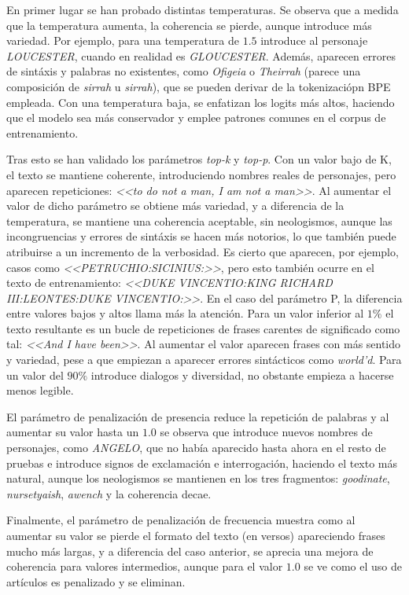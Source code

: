 \documentclass[11pt]{book}
\begin{document}
En primer lugar se han probado distintas temperaturas. Se observa que a medida que la temperatura aumenta, la coherencia se pierde, aunque introduce más variedad. Por ejemplo, para una temperatura de $1.5$ introduce al personaje \textit{LOUCESTER}, cuando en realidad es \textit{GLOUCESTER}. Además, aparecen errores de sintáxis y palabras no existentes, como \textit{Ofigeia} o \textit{Theirrah} (parece una composición de \textit{sirrah} u \textit{sirrah}), que se pueden derivar de la tokenizaciópn BPE empleada. Con una temperatura baja, se enfatizan los logits más altos, haciendo que el modelo sea más conservador y emplee patrones comunes en el corpus de entrenamiento. 

Tras esto se han validado los parámetros \textit{top-k} y \textit{top-p}. Con un valor bajo de K, el texto se mantiene coherente, introduciendo nombres reales de personajes, pero aparecen repeticiones: \textit{<<to do not a man, I am not a man>>}. Al aumentar el valor de dicho parámetro se obtiene más variedad, y a diferencia de la temperatura, se mantiene una coherencia aceptable, sin neologismos, aunque las incongruencias y errores de sintáxis se hacen más notorios, lo que también puede atribuirse a un incremento de la verbosidad. Es cierto que aparecen, por ejemplo, casos como \textit{<<PETRUCHIO:SICINIUS:>>}, pero esto también ocurre en el texto de entrenamiento: \textit{<<DUKE VINCENTIO:KING RICHARD III:LEONTES:DUKE VINCENTIO:>>}. En el caso del parámetro P, la diferencia entre valores bajos y altos llama más la atención. Para un valor inferior al $1\%$ el texto resultante es un bucle de repeticiones de frases carentes de significado como tal: \textit{<<And I have been>>}. Al aumentar el valor aparecen frases con más sentido y variedad, pese a que empiezan a aparecer errores sintácticos como \textit{world’d}. Para un valor del $90\%$ introduce dialogos y diversidad, no obstante empieza a hacerse menos legible.

El parámetro de penalización de presencia reduce la repetición de palabras y al aumentar su valor hasta un $1.0$ se observa que introduce nuevos nombres de personajes, como \textit{ANGELO}, que no había aparecido hasta ahora en el resto de pruebas e introduce signos de exclamación e interrogación, haciendo el texto más natural, aunque los neologismos se mantienen en los tres fragmentos: \textit{goodinate}, \textit{nursetyaish}, \textit{awench} y la coherencia decae.

Finalmente, el parámetro de penalización de frecuencia muestra como al aumentar su valor se pierde el formato del texto (en versos) apareciendo frases mucho más largas, y a diferencia del caso anterior, se aprecia una mejora de coherencia para valores intermedios, aunque para el valor $1.0$ se ve como el uso de artículos es penalizado y se eliminan. 
\end{document}
